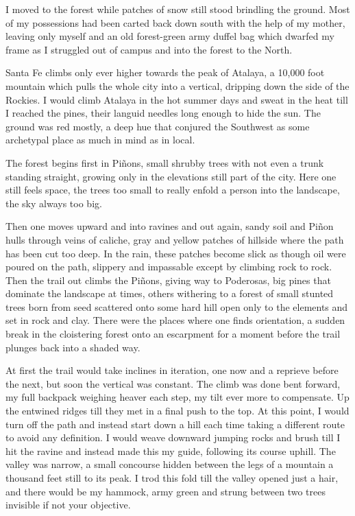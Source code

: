 \documentclass[ebook, 10pt, openright, onecolumn]{memoir}
\begin{document}
I moved to the forest while patches of snow still stood brindling the
ground. Most of my possessions had been carted back down south with the help of
my mother, leaving only myself and an old forest-green army duffel bag which
dwarfed my frame as I struggled out of campus and into the forest to the North.

Santa Fe climbs only ever higher towards the peak of Atalaya, a 10,000 foot
mountain which pulls the whole city into a vertical, dripping down the side of
the Rockies. I would climb Atalaya in the hot summer days and sweat in the heat
till I reached the pines, their languid needles long enough to hide the sun.
The ground was red mostly, a deep hue that conjured the Southwest as some
archetypal place as much in mind as in local.

The forest begins first in Piñons, small shrubby trees with not even a trunk
standing straight, growing only in the elevations still part of the city.  Here
one still feels space, the trees too small to really enfold a person into the
landscape, the sky always too big. 

Then one moves upward and into ravines and out again, sandy soil and Piñon hulls
through veins of caliche, gray and yellow patches of hillside where the path has
been cut too deep. In the rain, these patches become slick as though oil were
poured on the path, slippery and impassable except by climbing rock to rock.
Then the trail out climbs the Piñons, giving way to Poderosas, big pines that
dominate the landscape at times, others withering to a forest of small stunted
trees born from seed scattered onto some hard hill open only to the elements
and set in rock and clay.  There were the places where one finds orientation, a
sudden break in the cloistering forest onto an escarpment for a moment before the
trail plunges back into a shaded way.

At first the trail would take inclines in iteration, one now and a reprieve
before the next, but soon the vertical was constant.  The climb was done bent
forward, my full backpack weighing heaver each step, my tilt ever more to
compensate.  Up the entwined ridges till they met in a final push to the top.
At this point, I would turn off the path and instead start down a hill each time
taking a different route to avoid any definition. I would weave downward jumping
rocks and brush till I hit the ravine and instead made this my guide, following
its course uphill.  The valley was narrow, a small concourse hidden between the
legs of a mountain a thousand feet still to its peak.  I trod this fold till the
valley opened just a hair, and there would be my hammock, army green and strung
between two trees invisible if not your objective.
\end{document}
